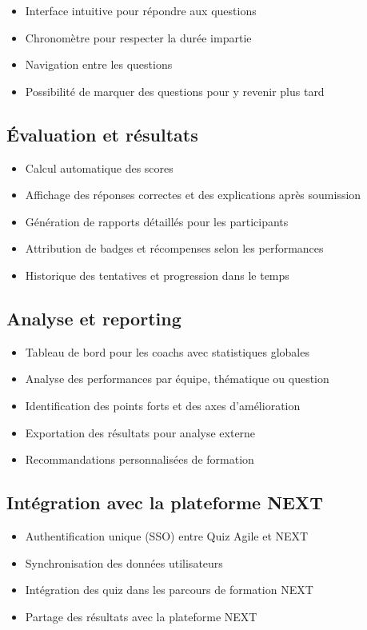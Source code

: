 \documentclass[12pt,a4paper]{report}
\begin{document}
\begin{itemize}
\item Interface intuitive pour répondre aux questions
\item Chronomètre pour respecter la durée impartie
\item Navigation entre les questions
\item Possibilité de marquer des questions pour y revenir plus tard
\end{itemize}

\subsection{Évaluation et résultats}

\begin{itemize}
\item Calcul automatique des scores
\item Affichage des réponses correctes et des explications après soumission
\item Génération de rapports détaillés pour les participants
\item Attribution de badges et récompenses selon les performances
\item Historique des tentatives et progression dans le temps
\end{itemize}

\subsection{Analyse et reporting}

\begin{itemize}
\item Tableau de bord pour les coachs avec statistiques globales
\item Analyse des performances par équipe, thématique ou question
\item Identification des points forts et des axes d'amélioration
\item Exportation des résultats pour analyse externe
\item Recommandations personnalisées de formation
\end{itemize}

\subsection{Intégration avec la plateforme NEXT}

\begin{itemize}
\item Authentification unique (SSO) entre Quiz Agile et NEXT
\item Synchronisation des données utilisateurs
\item Intégration des quiz dans les parcours de formation NEXT
\item Partage des résultats avec la plateforme NEXT
\end{itemize}
\end{document}
